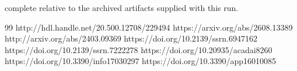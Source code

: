 \documentclass[conference]{IEEEtran}
\begin{document}
complete relative to the archived artifacts supplied with this run.

\begin{thebibliography}{99}
 http://hdl.handle.net/20.500.12708/229494
 https://arxiv.org/abs/2608.13389
 http://arxiv.org/abs/2403.09369
 https://doi.org/10.2139/ssrn.6947162
 https://doi.org/10.2139/ssrn.7222278
 https://doi.org/10.20935/acadai8260
 https://doi.org/10.3390/info17030297
 https://doi.org/10.3390/app16010085
\end{thebibliography}
\end{document}
